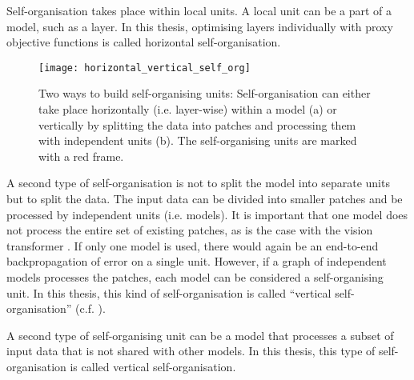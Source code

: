 \begin{implementation}
	Self-organisation takes place within local units. A local unit can be a part of a model, such as a layer.
	In this thesis,  optimising layers individually with proxy objective functions is called horizontal self-organisation.
\end{implementation}

\begin{figure}[h]
    \centering
    \texttt{[image: horizontal\_vertical\_self\_org]}
     \caption[Overview of horizontal and vertical self-organisation]{Two ways to build self-organising units: Self-organisation can either take place horizontally (i.e. layer-wise) within a model (a) or vertically by splitting the data into patches and processing them with independent units (b). The self-organising units are marked with a red frame.}
\end{figure}
 
A second type of self-organisation is not to split the model into separate units but to split the data.
The input data can be divided into smaller patches and be processed by independent units (i.e. models).
It is important that one model does not process the entire set of existing patches, as is the case with the vision transformer . If only one model is used, there would again be an end-to-end backpropagation of error on a single unit.
However, if a graph of independent models processes the patches, each model can be considered a self-organising unit.
In this thesis, this kind of self-organisation is called  ``vertical self-organisation'' (c.f.  ).

\begin{implementation}
	A second type of self-organising unit can be a model that processes a subset of input data that is not shared with other models. In this thesis, this type of self-organisation is called vertical self-organisation.
\end{implementation}


